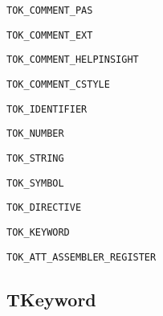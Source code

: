 \documentclass{report}
\newif\ifpdf
\begin{document}
\begin{list}{}
\begin{description}
\item[\texttt{TOK{\_}COMMENT{\_}PAS}] \label{PasDoc_Tokenizer-TOK_COMMENT_PAS}
\index{}
 
\item[\texttt{TOK{\_}COMMENT{\_}EXT}] \label{PasDoc_Tokenizer-TOK_COMMENT_EXT}
\index{}
 
\item[\texttt{TOK{\_}COMMENT{\_}HELPINSIGHT}] \label{PasDoc_Tokenizer-TOK_COMMENT_HELPINSIGHT}
\index{}
 
\item[\texttt{TOK{\_}COMMENT{\_}CSTYLE}] \label{PasDoc_Tokenizer-TOK_COMMENT_CSTYLE}
\index{}
 
\item[\texttt{TOK{\_}IDENTIFIER}] \label{PasDoc_Tokenizer-TOK_IDENTIFIER}
\index{}
 
\item[\texttt{TOK{\_}NUMBER}] \label{PasDoc_Tokenizer-TOK_NUMBER}
\index{}
 
\item[\texttt{TOK{\_}STRING}] \label{PasDoc_Tokenizer-TOK_STRING}
\index{}
 
\item[\texttt{TOK{\_}SYMBOL}] \label{PasDoc_Tokenizer-TOK_SYMBOL}
\index{}
 
\item[\texttt{TOK{\_}DIRECTIVE}] \label{PasDoc_Tokenizer-TOK_DIRECTIVE}
\index{}
 
\item[\texttt{TOK{\_}KEYWORD}] \label{PasDoc_Tokenizer-TOK_KEYWORD}
\index{}
 
\item[\texttt{TOK{\_}ATT{\_}ASSEMBLER{\_}REGISTER}] \label{PasDoc_Tokenizer-TOK_ATT_ASSEMBLER_REGISTER}
\index{}
 
\end{description}


\end{list}
\ifpdf
\subsection*{\large{\textbf{TKeyword}}\normalsize\hspace{1ex}\hrulefill}
\else
\end{document}
